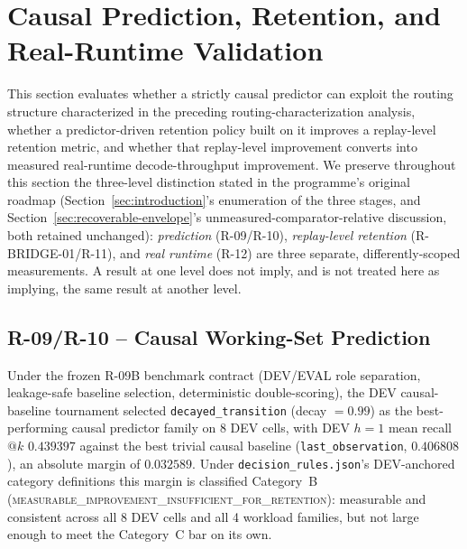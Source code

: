 \section{Causal Prediction, Retention, and Real-Runtime Validation}
\label{sec:iic}

This section evaluates whether a strictly causal predictor can exploit the
routing structure characterized in the preceding routing-characterization
analysis, whether a predictor-driven
retention policy built on it improves a replay-level retention metric, and
whether that replay-level improvement converts into measured real-runtime
decode-throughput improvement. We preserve throughout this section the
three-level distinction stated in the programme's original roadmap
(Section~\ref{sec:introduction}'s enumeration of the three stages, and
Section~\ref{sec:recoverable-envelope}'s unmeasured-comparator-relative
discussion, both retained unchanged): \emph{prediction} (R-09/R-10),
\emph{replay-level retention} (R-BRIDGE-01/R-11), and \emph{real runtime}
(R-12) are three separate, differently-scoped measurements. A result at one level does not imply, and
is not treated here as implying, the same result at another level.



\subsection{R-09/R-10 -- Causal Working-Set Prediction}
\label{sec:r2-10}

Under the frozen R-09B benchmark contract (DEV/EVAL role separation,
leakage-safe baseline selection, deterministic double-scoring), the DEV
causal-baseline tournament selected \texttt{decayed\_transition} (decay
$=0.99$) as the best-performing causal predictor family on 8 DEV cells,
with DEV $h=1$ mean recall$@k$ $0.439397$ against the best trivial causal
baseline (\texttt{last\_observation}, $0.406808$), an absolute margin of
$0.032589$. Under \texttt{decision\_rules.json}'s DEV-anchored category
definitions this margin is classified Category~B
(\textsc{measurable\_improvement\_insufficient\_for\_retention}): measurable
and consistent across all 8 DEV cells and all 4 workload families, but not
large enough to meet the Category~C bar on its own.

